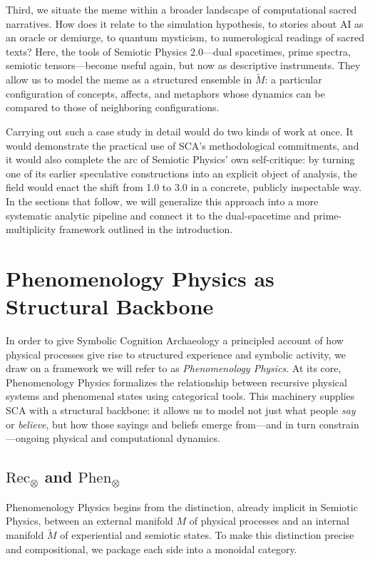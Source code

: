 \documentclass[12]{amsart}
\theoremstyle{plain}
\begin{document}
Third, we situate the meme within a broader landscape of computational sacred narratives. How does it relate to the simulation hypothesis, to stories about AI as an oracle or demiurge, to quantum mysticism, to numerological readings of sacred texts? Here, the tools of Semiotic Physics 2.0---dual spacetimes, prime spectra, semiotic tensors---become useful again, but now as descriptive instruments. They allow us to model the meme as a structured ensemble in $\tilde M$: a particular configuration of concepts, affects, and metaphors whose dynamics can be compared to those of neighboring configurations.

Carrying out such a case study in detail would do two kinds of work at once. It would demonstrate the practical use of SCA's methodological commitments, and it would also complete the arc of Semiotic Physics' own self-critique: by turning one of its earlier speculative constructions into an explicit object of analysis, the field would enact the shift from 1.0 to 3.0 in a concrete, publicly inspectable way. In the sections that follow, we will generalize this approach into a more systematic analytic pipeline and connect it to the dual-spacetime and prime-multiplicity framework outlined in the introduction.

\section{Phenomenology Physics as Structural Backbone}

In order to give Symbolic Cognition Archaeology a principled account of how physical processes give rise to structured experience and symbolic activity, we draw on a framework we will refer to as \emph{Phenomenology Physics}. At its core, Phenomenology Physics formalizes the relationship between recursive physical systems and phenomenal states using categorical tools. This machinery supplies SCA with a structural backbone: it allows us to model not just what people \emph{say} or \emph{believe}, but how those sayings and beliefs emerge from—and in turn constrain—ongoing physical and computational dynamics.

\subsection{$\text{Rec}_\otimes$ and $\text{Phen}_\otimes$}

Phenomenology Physics begins from the distinction, already implicit in Semiotic Physics, between an external manifold $M$ of physical processes and an internal manifold $\tilde M$ of experiential and semiotic states. To make this distinction precise and compositional, we package each side into a monoidal category.
\end{document}
